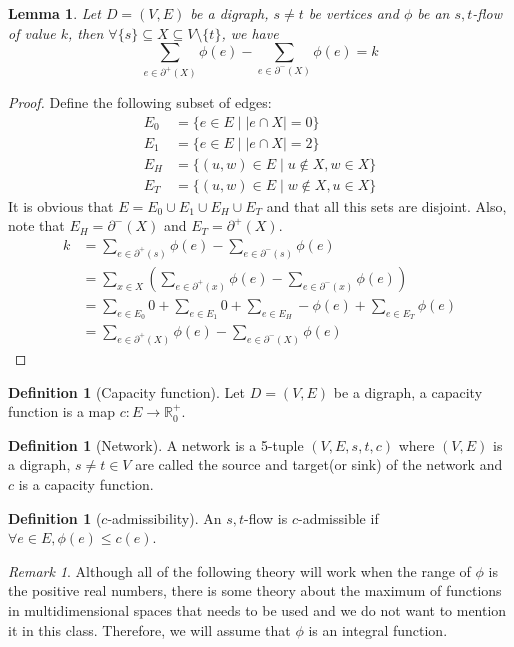 \documentclass{tufte-handout}
\newcommand{\bra}[1]{\left(#1\right)}
\newtheorem{lem}[thm]{Lemma}
\theoremstyle{definition}
\newtheorem{defn}[thm]{Definition}
\theoremstyle{remark}
\newtheorem{rem}[thm]{Remark}
\newcommand{\R}{\mathbb{R}}
\begin{document}
\begin{lem}
	Let $D=(V,E)$ be a digraph, $s\neq t$ be vertices and $\phi$ be an $s,t$-flow of value $k$, then $\forall \{s\} \subseteq X \subseteq V\setminus\{t\}$, we have 
	\[ \sum_{e \in \partial^+(X)}\phi(e) - \sum_{e \in \partial^-(X)}\phi(e) = k \]
\end{lem}
\begin{proof}
	Define the following subset of edges:
	\begin{align*}
		E_0 &= \{e \in E \mid |e \cap X| = 0 \}\\
		E_1 &= \{e \in E \mid |e \cap X| = 2 \}\\
		E_H &= \{(u,w) \in E \mid u \notin X, w \in X\}\\
		E_T &= \{(u,w) \in E \mid w \notin X, u \in X\}
	\end{align*}
	It is obvious that $E = E_0 \cup E_1 \cup E_H \cup E_T$ and that all this sets are disjoint. Also, note that $E_H = \partial^-(X)$ and $E_T = \partial^+(X)$.
	\begin{align*}
		k &= \sum_{e \in \partial^+(s)} \phi(e) - \sum_{e \in \partial^-(s)}\phi(e)\\
		&=\sum_{x \in X} \bra{\sum_{e \in \partial^+(x)} \phi(e) - \sum_{e \in \partial^-(x)}\phi(e)}\\
		&= \sum_{e \in E_0} 0 + \sum_{e \in E_1}0+ \sum_{e \in E_H} -\phi(e) + \sum_{e \in E_T} \phi(e)\\
		&= \sum_{e \in \partial^+(X)}\phi(e) - \sum_{e \in \partial^-(X)}\phi(e)
	\end{align*}
\end{proof}
\begin{defn}[Capacity function]
	Let $D= (V,E)$ be a digraph, a capacity function is a map $c : E\rightarrow \R^+_0$.
\end{defn}
\begin{defn}[Network]
	A network is a 5-tuple $(V,E,s,t,c)$ where $(V,E)$ is a digraph, $s \neq t \in V$ are called the source and target(or sink) of the network and $c$ is a capacity function.
\end{defn}
\begin{defn}[$c$-admissibility]
	An $s,t$-flow is $c$-admissible if $\forall e \in E, \phi(e) \leq c(e)$.
\end{defn}
\begin{rem}
	Although all of the following theory will work when the range of $\phi$ is the positive real numbers, there is some theory about the maximum of functions in multidimensional spaces that needs to be used and we do not want to mention it in this class. Therefore, we will assume that $\phi$ is an integral function.
\end{rem}
\end{document}
